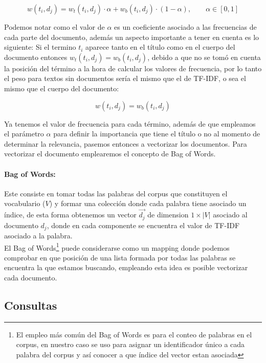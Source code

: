 \documentclass[runningheads,a4paper]{llncs}
\begin{document}
\begin{equation}
	w(t_i, d_j) = w_t(t_i, d_j) · \alpha + w_b(t_i, d_j) · (1 - \alpha), \qquad \alpha \in [0, 1]
\end{equation}

Podemos notar como el valor de $\alpha$ es un coeficiente asociado a las frecuencias de cada parte del documento, además un aspecto importante a tener en cuenta es lo siguiente: Si el termino $t_i$ aparece tanto en el título como en el cuerpo del documento entonces $w_t(t_i, d_j) = w_b(t_i, d_j)$, debido a que no se tomó en cuenta la posición del término a la hora de calcular los valores de frecuencia, por lo tanto el peso para textos sin documentos sería el mismo que el de TF-IDF, o sea el mismo que el cuerpo del documento: 

\begin{equation}
	w(t_i, d_j) = w_b(t_i, d_j)
\end{equation}

Ya tenemos el valor de frecuencia para cada término, además de que empleamos el parámetro  $\alpha$ para definir la importancia que tiene el título o no al momento de determinar la relevancia, pasemos entonces a vectorizar los documentos. Para vectorizar el documento emplearemos el concepto de Bag of Words.

\paragraph*{Bag of Words:} Este consiste en tomar todas las palabras del corpus que constituyen el vocabulario ($V$) y formar una colección donde cada palabra tiene asociado un índice, de esta forma obtenemos un vector $\overrightarrow{d_j}$ de dimension $1 \times |V|$ asociado al documento $d_j$, donde en cada componente se encuentra el valor de TF-IDF asociado a la palabra. \\

El Bag of Words\footnote{El empleo más común del Bag of Words es para el conteo de palabras en el corpus, en nuestro caso se uso para asignar un identificador único a cada palabra del corpus y así conocer a que índice del vector estan asociada} puede considerarse como un mapping donde podemos comprobar en que posición de una lista formada por todas las palabras se encuentra la que estamos buscando, empleando esta idea es posible vectorizar cada documento.

\subsection*{Consultas}
\end{document}
